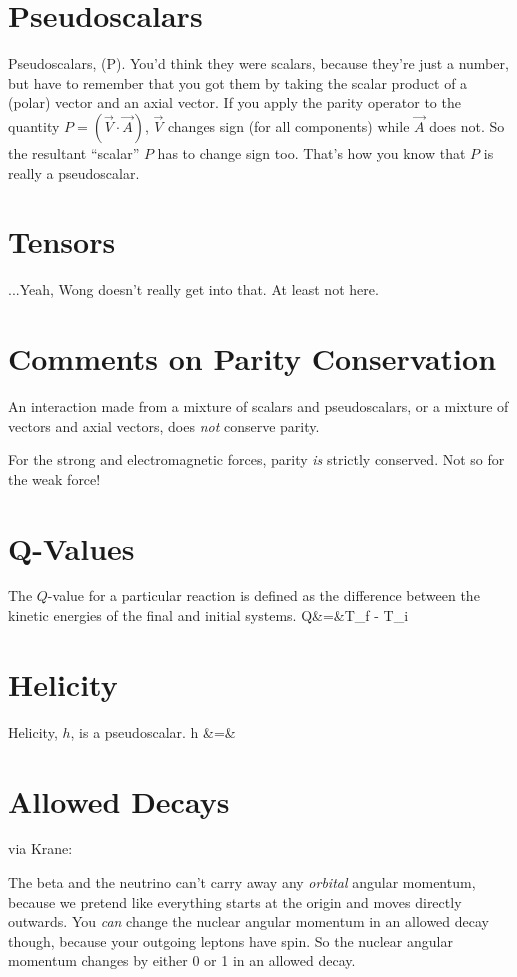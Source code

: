 \section{Pseudoscalars}
Pseudoscalars, (P).  You'd think they were scalars, because they're just a number, but have to remember that you got them by taking the scalar product of a (polar) vector and an axial vector.  If you apply the parity operator to the quantity $P = (\vec{V} \cdot \vec{A})$, $\vec{V}$ changes sign (for all components) while $\vec{A}$ does not.  So the resultant ``scalar'' $P$ has to change sign too.  That's how you know that $P$ is really a pseudoscalar.

\section{Tensors}
...Yeah, Wong doesn't really get into that.  At least not here.

\section{Comments on Parity Conservation}
An interaction made from a mixture of scalars and pseudoscalars, or a mixture of vectors and axial vectors, does \emph{not} conserve parity.  

For the strong and electromagnetic forces, parity \emph{is} strictly conserved.  Not so for the weak force!

\section{Q-Values}
The $Q$-value for a particular reaction is defined as the difference between the kinetic energies of the final and initial systems.
\bea
Q&=&T_f - T_i
\eea

\section{Helicity}
Helicity, $h$, is a pseudoscalar.
\bea
h &=& 
\eea

\section{Allowed Decays}
via Krane:

The beta and the neutrino can't carry away any \emph{orbital} angular momentum, because we pretend like everything starts at the origin and moves directly outwards.  You \emph{can} change the nuclear angular momentum in an allowed decay though, because your outgoing leptons have spin.  So the nuclear angular momentum changes by either 0 or 1 in an allowed decay.

